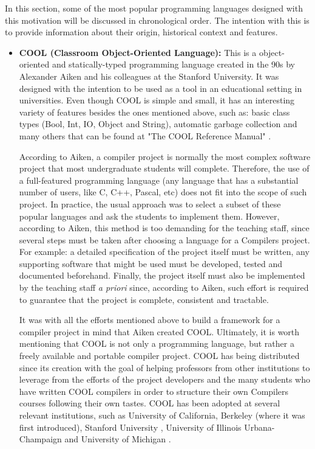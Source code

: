 In this section, some of the most popular programming languages designed with this motivation will be discussed in chronological order. The intention with this is to provide information about their origin, historical context and features.

\begin{itemize}
    \item \textbf{COOL (Classroom Object-Oriented Language):} This is a object-oriented and statically-typed programming language \cite{aiken1996cool} created in the 90s by Alexander Aiken and his colleagues at the Stanford University. It was designed with the intention to be used as a tool in an educational setting in universities. Even though COOL is simple and small, it has an interesting variety of features besides the ones mentioned above, such as: basic class types (Bool, Int, IO, Object and String), automatic garbage collection and many others that can be found at "The COOL Reference Manual" \cite{cool_reference_manual}.
    
    According to Aiken, a compiler project is normally the most complex software project that most undergraduate students will complete. Therefore, the use of a full-featured programming language (any language that has a substantial number of users, like C, C++, Pascal, etc) does not fit into the scope of such project. In practice, the usual approach was to select a subset of these popular languages and ask the students to implement them. However, according to Aiken, this method is too demanding for the teaching staff, since several steps must be taken after choosing a language for a Compilers project. For example: a detailed specification of the project itself must be written, any supporting software that might be used must be developed, tested and documented beforehand. Finally, the project itself must also be implemented by the teaching staff \textit{a priori} since, according to Aiken, such effort is required to guarantee that the project is complete, consistent and tractable.
    
    It was with all the efforts mentioned above to build a framework for a compiler project  in mind that Aiken created COOL. Ultimately, it is worth mentioning that COOL is not only a programming language, but rather a freely available and portable compiler project. COOL has being distributed since its creation with the goal of helping professors from other institutions to leverage from the efforts of the project developers and the many students who have written COOL compilers in order to structure their own Compilers courses following their own tastes. COOL has been adopted at several relevant institutions, such as University of California, Berkeley \cite{aiken1996cool} (where it was first introduced), Stanford University \cite{stanford_cs143_compilers_course_page}, University of Illinois Urbana-Champaign \cite{university_of_illinois_urbana_champaign_compilers_course_page} and University of Michigan \cite{university_of_michigan_compiler_construction_course_page}.
    

\end{itemize}
